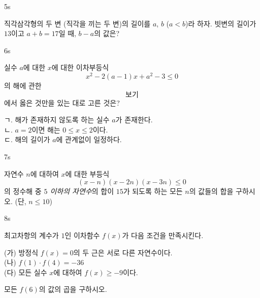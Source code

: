 \documentclass[10pt]{article}
\begin{document}
\begin{pagepair}

\begin{problem}{5}{s}
\par\smallskip
직각삼각형의 두 변 (직각을 끼는 두 변)의 길이를 $a$, $b$ ($a < b$)라 하자. 빗변의 길이가 $13$이고 $a + b = 17$일 때, $b - a$의 값은?
\begin{center}
\end{center}
\begin{choices}
\end{choices}
\end{problem}

\begin{problem}{6}{s}
\par\smallskip
실수 $a$에 대한 $x$에 대한 이차부등식
$$x^2 - 2(a - 1)x + a^2 - 3 \le 0$$
의 해에 관한 \[보기\]에서 옳은 것만을 있는 대로 고른 것은?
\begin{conditions}
\setlength{\baselineskip}{1.4\baselineskip}
ㄱ. 해가 존재하지 않도록 하는 실수 $a$가 존재한다. \\[6pt]
ㄴ. $a = 2$이면 해는 $0 \le x \le 2$이다. \\[6pt]
ㄷ. 해의 길이가 $a$에 관계없이 일정하다.
\end{conditions}
\begin{choices}
\end{choices}
\end{problem}

\end{pagepair}

\begin{pagepair}

\begin{problem}{7}{s}
\par\smallskip
자연수 $n$에 대하여 $x$에 대한 부등식
$$(x - n)(x - 2n)(x - 3n) \le 0$$
의 정수해 중 \emph{$5$ 이하의 자연수}의 합이 $15$가 되도록 하는 모든 $n$의 값들의 합을 구하시오. (단, $n \le 10$)
\end{problem}

\begin{problem}{8}{s}
\par\smallskip
최고차항의 계수가 $1$인 이차함수 $f(x)$가 다음 조건을 만족시킨다.
\begin{conditions}
\setlength{\baselineskip}{1.4\baselineskip}
(가) 방정식 $f(x) = 0$의 두 근은 서로 다른 자연수이다. \\[4pt]
(나) $f(1) \cdot f(4) = -36$ \\[4pt]
(다) 모든 실수 $x$에 대하여 $f(x) \ge -9$이다.
\end{conditions}
모든 $f(6)$의 값의 곱을 구하시오.
\end{problem}

\end{pagepair}
\end{document}
